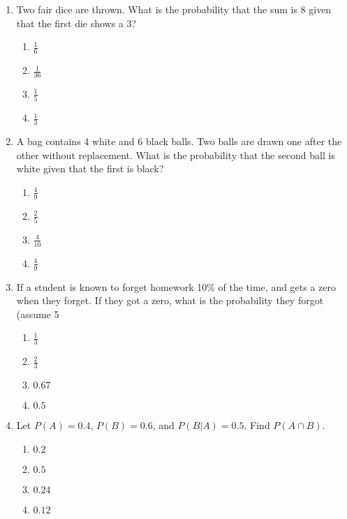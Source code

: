 \begin{enumerate}
\item Two fair dice are thrown. What is the probability that the sum is 8 given that the first die shows a 3?

\begin{enumerate}[label=(\alph*)]
\item \(\frac{1}{6}\) \quad \item \(\frac{1}{36}\) \quad \item \(\frac{1}{5}\) \quad \item \(\frac{1}{3}\)
\end{enumerate}

\newpage
\item A bag contains 4 white and 6 black balls. Two balls are drawn one after the other without replacement. What is the probability that the second ball is white given that the first is black?

\begin{enumerate}[label=(\alph*)]
\item \(\frac{4}{9}\) \quad \item \(\frac{2}{5}\) \quad \item \(\frac{4}{10}\) \quad \item \(\frac{4}{9}\)
\end{enumerate}

\item If a student is known to forget homework 10\% of the time, and gets a zero when they forget. If they got a zero, what is the probability they forgot (assume 5%

\begin{enumerate}[label=(\alph*)]
\item \(\frac{1}{3}\) \quad \item \(\frac{2}{3}\) \quad \item \(0.67\) \quad \item \(0.5\)
\end{enumerate}

\item Let \(P(A) = 0.4\), \(P(B) = 0.6\), and \(P(B|A) = 0.5\). Find \(P(A \cap B)\).

\begin{enumerate}[label=(\alph*)]
\item \(0.2\) \quad \item \(0.5\) \quad \item \(0.24\) \quad \item \(0.12\)
\end{enumerate}


\end{enumerate}
